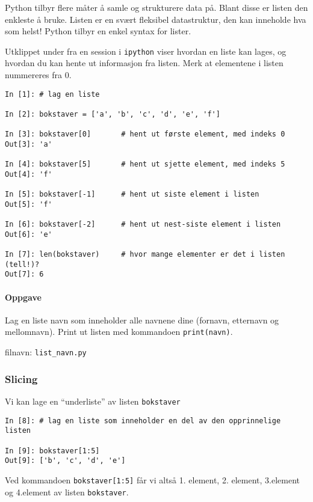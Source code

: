 \documentclass[]{article}
\let\oldparagraph\paragraph
\renewcommand{\paragraph}[1]{\oldparagraph{#1}\mbox{}}
\begin{document}
Python tilbyr flere måter å samle og strukturere data på. Blant disse er
listen den enkleste å bruke. Listen er en svært fleksibel datastruktur,
den kan inneholde hva som helst! Python tilbyr en enkel syntax for
lister.

Utklippet under fra en session i \texttt{ipython} viser hvordan en liste
kan lages, og hvordan du kan hente ut informasjon fra listen. Merk at
elementene i listen nummereres fra \(0\).

\begin{verbatim}
In [1]: # lag en liste

In [2]: bokstaver = ['a', 'b', 'c', 'd', 'e', 'f']   

In [3]: bokstaver[0]       # hent ut første element, med indeks 0
Out[3]: 'a'

In [4]: bokstaver[5]       # hent ut sjette element, med indeks 5
Out[4]: 'f'

In [5]: bokstaver[-1]      # hent ut siste element i listen
Out[5]: 'f'

In [6]: bokstaver[-2]      # hent ut nest-siste element i listen
Out[6]: 'e'

In [7]: len(bokstaver)     # hvor mange elementer er det i listen (tell!)?
Out[7]: 6
\end{verbatim}

\paragraph{Oppgave}\label{oppgave-3}

Lag en liste navn som inneholder alle navnene dine (fornavn, etternavn
og mellomnavn). Print ut listen med kommandoen \texttt{print(navn)}.

filnavn: \texttt{list\_navn.py}

\subsubsection{Slicing}\label{slicing}

Vi kan lage en ``underliste'' av listen \texttt{bokstaver}

\begin{verbatim}
In [8]: # lag en liste som inneholder en del av den opprinnelige listen

In [9]: bokstaver[1:5]
Out[9]: ['b', 'c', 'd', 'e']
\end{verbatim}

Ved kommandoen \texttt{bokstaver{[}1:5{]}} får vi altså 1. element, 2.
element, 3.element og 4.element av listen \texttt{bokstaver}.
\end{document}
